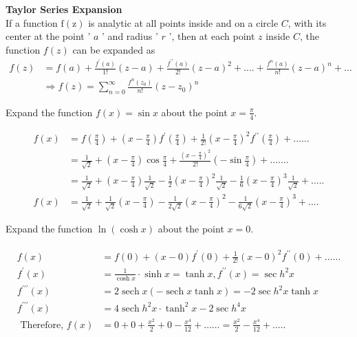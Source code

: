 \textbf{Taylor Series Expansion}\\
If a function $\mathrm{f}(\mathrm{z})$ is analytic at all points inside and on a circle $C$, with its center at the point ' $a$ ' and radius ' $r$ ', then at each point $z$ inside $C$, the function $f(z)$ can be expanded as
\begin{align*}
	f(z) &=f(a)+\frac{f^{\prime}(a)}{1 !}(z-a)+\frac{f^{\prime \prime}(a)}{2 !}(z-a)^{2}+\ldots .+\frac{f^{n}(a)}{n !}(z-a)^{n}+\ldots \\
	& \Rightarrow f(z)=\sum_{n=0}^{\infty} \frac{f^{n}\left(z_{0}\right)}{n !}\left(z-z_{0}\right)^{n}
\end{align*}
\begin{exercise}
	Expand the function $f(x)=\sin x$ about the point $x=\frac{\pi}{4}$.
\end{exercise}
\begin{answer}
	\begin{align*}
	f(x) &=f\left(\frac{\pi}{4}\right)+\left(x-\frac{\pi}{4}\right) f^{\prime}\left(\frac{\pi}{4}\right)+\frac{1}{2 !}\left(x-\frac{\pi}{4}\right)^{2} f^{\prime \prime}\left(\frac{\pi}{4}\right)+\ldots \ldots \\
	&=\frac{1}{\sqrt{2}}+\left(x-\frac{\pi}{4}\right) \cos \frac{\pi}{4}+\frac{\left(x-\frac{\pi}{4}\right)^{2}}{2 !}\left(-\sin \frac{\pi}{4}\right)+\ldots \ldots .\\
	\quad&=\frac{1}{\sqrt{2}}+\left(x-\frac{\pi}{4}\right) \frac{1}{\sqrt{2}}-\frac{1}{2}\left(x-\frac{\pi}{4}\right)^{2} \frac{1}{\sqrt{2}}-\frac{1}{6}\left(x-\frac{\pi}{4}\right)^{3} \frac{1}{\sqrt{2}}+\ldots . . \\
	f(x)&=\frac{1}{\sqrt{2}}+\frac{1}{\sqrt{2}}\left(x-\frac{\pi}{4}\right)-\frac{1}{2 \sqrt{2}}\left(x-\frac{\pi}{4}\right)^{2}-\frac{1}{6 \sqrt{2}}\left(x-\frac{\pi}{4}\right)^{3}+\ldots .
	\end{align*}
\end{answer}
\begin{exercise}
	Expand the function $\ln (\cosh x)$ about the point $x=0$.
\end{exercise}
\begin{answer}
	\begin{align*}
	\begin{aligned}
	f(x)&=f(0)+(x-0) f^{\prime}(0)+\frac{1}{2 !}(x-0)^{2} f^{\prime \prime}(0)+\ldots \ldots \\
	f^{\prime}(x)&=\frac{1}{\cosh x} \cdot \sinh x=\tanh x, f^{\prime \prime}(x)=\sec h^{2} x \\
	f^{\prime \prime \prime}(x)&=2 \operatorname{sech} x(-\operatorname{sech} x \tanh x)=-2 \sec h^{2} x \tanh x \\
	f^{\prime \prime \prime}(x)&=4 \operatorname{sech} h^{2} x \cdot \tanh ^{2} x-2 \sec h^{4} x\\
	\text { Therefore, } f(x)&=0+0+\frac{x^{2}}{2}+0-\frac{x^{4}}{12}+\ldots \ldots=\frac{x^{2}}{2}-\frac{x^{4}}{12}+\ldots . .
	\end{aligned}
	\end{align*}
\end{answer}
